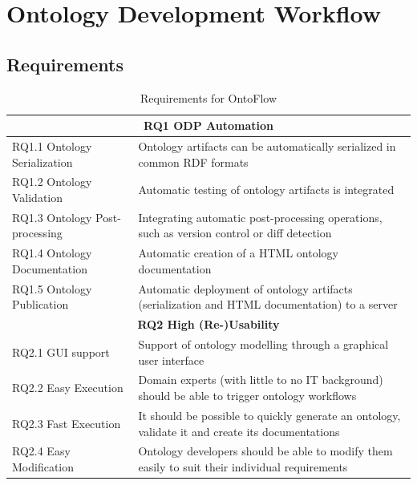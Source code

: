 \documentclass[runningheads]{llncs}
\begin{document}
\section{Ontology Development Workflow}\label{sec:ontoflow}
\subsection{Requirements}

\begin{table}[hbt]
	\caption{Requirements for OntoFlow}
	\renewcommand{\arraystretch}{1.3}
	\begin{tabular}{p{} p{}}
		\hline
		\multicolumn{2}{c}{\textbf{RQ1 ODP Automation}}                                                                                  \\
		\hline\hline
		RQ1.1 Ontology Serialization  & Ontology artifacts can be automatically serialized in common RDF formats                         \\

		RQ1.2 Ontology Validation     & Automatic testing of ontology artifacts is integrated                                            \\

		RQ1.3 Ontology Post-processing & Integrating automatic post-processing operations, such as version control or diff detection       \\

		RQ1.4 Ontology  Documentation & Automatic creation of a HTML ontology documentation                                              \\

		RQ1.5 Ontology Publication    & Automatic deployment of ontology artifacts (serialization and HTML documentation) to a server    \\
		\hline
		\multicolumn{2}{c}{\textbf{RQ2 High (Re-)Usability}}                                                                             \\
		\hline
		\hline
		RQ2.1 GUI support             & Support of ontology modelling through a graphical user interface                                 \\

		RQ2.2 Easy Execution          & Domain experts (with little to no IT background) should be able to trigger ontology workflows    \\

		RQ2.3 Fast Execution          & It should be possible to quickly generate an ontology, validate it and create its documentations \\

		RQ2.4 Easy Modification       & Ontology developers should be able to modify them easily to suit their individual requirements   \\
		\hline
	\end{tabular}\label{tab:req}
\end{table}
\end{document}
